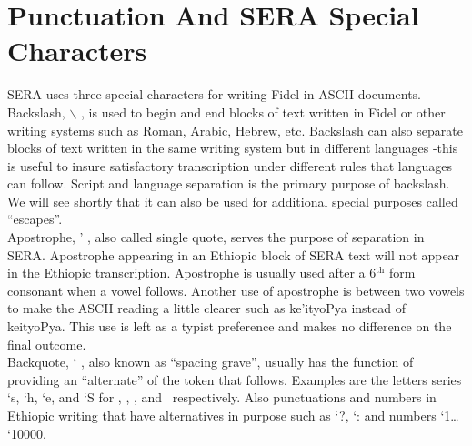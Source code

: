 

\section*{Punctuation And SERA Special Characters} 

SERA uses three special characters for writing Fidel in ASCII documents.
Backslash, $\backslash$ , is used to begin and end blocks of text written in 
Fidel or other
writing systems such as Roman, Arabic, Hebrew, etc.  Backslash can also separate
blocks of text written in the same writing system but in different languages
-this is useful to insure satisfactory transcription under different rules that
languages can follow.  Script and language separation is the primary purpose of
backslash.  We will see shortly that it can also be used for additional special
purposes called ``escapes''. \\

Apostrophe, ' , also called single quote, serves the purpose of separation in SERA.
Apostrophe appearing in an Ethiopic block of SERA text will not appear in the
Ethiopic transcription.  Apostrophe is usually used 
after a 6$^{\textrm{th}}$ form consonant when a vowel follows. 
Another use
of apostrophe is between two vowels to make the ASCII reading a little clearer such as
ke'ityoPya instead of keityoPya.  This use is left as a typist preference and makes no
difference on the final outcome. \\

Backquote, ` , also known as ``spacing grave'', usually has the function of providing
an ``alternate'' of the token that follows.  Examples are the letters series `s, `h,
`e, and `S for \sse, \hhe, \ee, and \SSe \  respectively.  Also punctuations and numbers in
Ethiopic writing that have alternatives in purpose such as `?, `: and numbers `1\dots
`10000. \\

